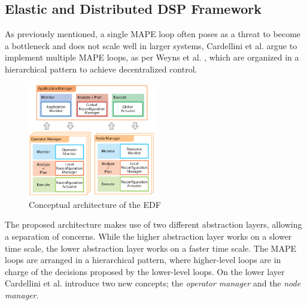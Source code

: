         \subsection{Elastic and Distributed DSP Framework}
        \label{sub:edf}
        As previously mentioned, a single MAPE loop often poses as a threat to become a bottleneck and does not scale well in larger systems\cite{cardellini}\cite{Cheng:2009:SES:1573856.1573858},
        Cardellini et al. argue to implement multiple MAPE loops, as per Weyns et al. \cite{Weyns2013}, which are organized in a hierarchical pattern to achieve decentralized control.
        \begin{figure}[hbt]
            \centering
            \includegraphics[width=0.5\textwidth]{Bilder/hierarchical.png}
            \caption{
                    Conceptual architecture of the EDF\cite{cardellini}
            }
            \label{fig:hierarchical}
        \end{figure}
        The proposed architecture makes use of two different abstraction layers, allowing a separation of concerns. 
        While the higher abstraction layer works on a slower time scale, the lower abstraction layer works on a faster time scale.
        The MAPE loops are arranged in a hierarchical pattern, where higher-level loops are in charge of the decisions proposed by the lower-level loops.
        On the lower layer Cardellini et al. introduce two new concepts; the \textit{operator manager} and the \textit{node manager}.

